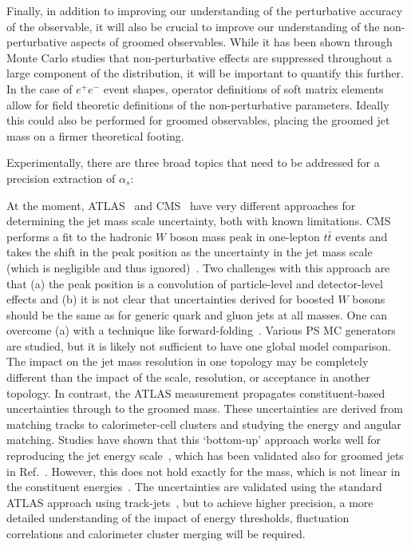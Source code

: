 \documentclass[11pt,letterpaper]{article}
\begin{document}
\vspace{5mm}

 Finally, in addition to improving our understanding of the perturbative accuracy of the observable, it will also be crucial to improve our understanding of the non-perturbative aspects of groomed observables. While it has been shown through Monte Carlo studies that non-perturbative effects are suppressed throughout a large component of the distribution, it will be important to quantify this further. In the case of $e^+e^-$ event shapes, operator definitions of soft matrix elements allow for field theoretic definitions of the non-perturbative parameters. Ideally this could also be performed for groomed observables, placing the groomed jet mass on a firmer theoretical footing.

\vspace{5mm}

Experimentally, there are three broad topics that need to be addressed for a precision extraction of $\alpha_s$:

\vspace{5mm}

 At the moment, ATLAS~\cite{Aaboud:2017qwh} and CMS~\cite{CMS-PAS-SMP-16-010} have very different approaches for determining the jet mass scale uncertainty, both with known limitations.  CMS performs a fit to the hadronic $W$ boson mass peak in one-lepton $t\bar{t}$ events and takes the shift in the peak position as the uncertainty in the jet mass scale (which is negligible and thus ignored)~\cite{Sirunyan:2016cao}.  Two challenges with this approach are that (a) the peak position is a convolution of particle-level and detector-level effects and (b) it is not clear that uncertainties derived for boosted $W$ bosons should be the same as for generic quark and gluon jets at all masses.  One can overcome (a) with a technique like forward-folding~\cite{ATLAS-CONF-2016-008,ATLAS-CONF-2016-035}.  Various PS MC generators are studied, but it is likely not sufficient to have one global model comparison.  The impact on the jet mass resolution in one topology may be completely different than the impact of the scale, resolution, or acceptance in another topology.  In contrast, the ATLAS measurement propagates constituent-based uncertainties through to the groomed mass.  These uncertainties are derived from matching tracks to calorimeter-cell clusters and studying the energy and angular matching.  Studies have shown that this `bottom-up' approach works well for reproducing the jet energy scale~\cite{Aaboud:2016hwh}, which has been validated also for groomed jets in Ref.~\cite{Aaboud:2017qwh}.  However, this does not hold exactly for the mass, which is not linear in the constituent energies~\cite{Nachman:2016qyc}.   The uncertainties are validated using the standard ATLAS approach using track-jets~\cite{Aad:2013gja,ATLAS-CONF-2017-063}, but to achieve higher precision, a more detailed understanding of the impact of energy thresholds, fluctuation correlations and calorimeter cluster merging will be required.
\end{document}
